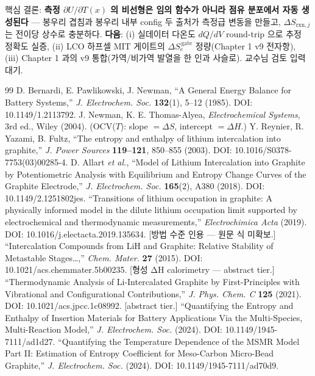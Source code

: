\documentclass[11pt,a4paper]{article}
\newcommand{\rxn}{\mathrm{rxn}}
\begin{document}
핵심 결론: \textbf{측정 $\partial U/\partial T(x)$ 의 비선형은 임의 함수가 아니라 점유 분포에서 자동
생성된다} — 봉우리 겹침과 봉우리 내부 config 두 출처가 측정급 변동을 만들고, $\Delta S_{\rxn,j}$ 는
전이당 상수로 충분하다. \textbf{다음}: (i) 실데이터 다온도 $dQ/dV$ round-trip 으로 추정 정확도 실증,
(ii) LCO 하프셀 MIT 게이트의 $\Delta S_e^{\,\mathrm{gate}}$ 정량(Chapter 1 v9 전자항), (iii) Chapter 1
과의 v9 통합(가역/비가역 발열을 한 인과 사슬로). 교수님 검토 입력 대기.

\begin{thebibliography}{99}
 D. Bernardi, E. Pawlikowski, J. Newman, ``A General Energy Balance for Battery Systems,'' \emph{J. Electrochem. Soc.} \textbf{132}(1), 5--12 (1985). DOI: 10.1149/1.2113792.
 J. Newman, K. E. Thomas-Alyea, \emph{Electrochemical Systems}, 3rd ed., Wiley (2004). (OCV($T$): slope $=\Delta S$, intercept $=\Delta H$.)
 Y. Reynier, R. Yazami, B. Fultz, ``The entropy and enthalpy of lithium intercalation into graphite,'' \emph{J. Power Sources} \textbf{119--121}, 850--855 (2003). DOI: 10.1016/S0378-7753(03)00285-4.
 D. Allart \emph{et al.}, ``Model of Lithium Intercalation into Graphite by Potentiometric Analysis with Equilibrium and Entropy Change Curves of the Graphite Electrode,'' \emph{J. Electrochem. Soc.} \textbf{165}(2), A380 (2018). DOI: 10.1149/2.1251802jes.
 ``Transitions of lithium occupation in graphite: A physically informed model in the dilute lithium occupation limit supported by electrochemical and thermodynamic measurements,'' \emph{Electrochimica Acta} (2019). DOI: 10.1016/j.electacta.2019.135634. [방법 수준 인용 — 원문 식 미확보.]
 ``Intercalation Compounds from LiH and Graphite: Relative Stability of Metastable Stages\ldots,'' \emph{Chem. Mater.} \textbf{27} (2015). DOI: 10.1021/acs.chemmater.5b00235. [형성 ΔH calorimetry — abstract tier.]
 ``Thermodynamic Analysis of Li-Intercalated Graphite by First-Principles with Vibrational and Configurational Contributions,'' \emph{J. Phys. Chem. C} \textbf{125} (2021). DOI: 10.1021/acs.jpcc.1c08992. [abstract tier.]
 ``Quantifying the Entropy and Enthalpy of Insertion Materials for Battery Applications Via the Multi-Species, Multi-Reaction Model,'' \emph{J. Electrochem. Soc.} (2024). DOI: 10.1149/1945-7111/ad1d27.
 ``Quantifying the Temperature Dependence of the MSMR Model Part II: Estimation of Entropy Coefficient for Meso-Carbon Micro-Bead Graphite,'' \emph{J. Electrochem. Soc.} (2024). DOI: 10.1149/1945-7111/ad70d9.

\end{thebibliography}
\end{document}
